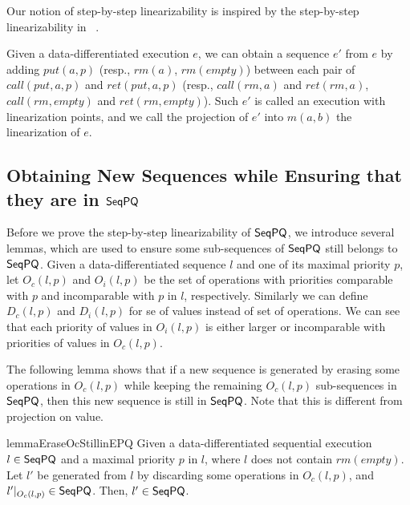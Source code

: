 Our notion of step-by-step linearizability is inspired by the step-by-step linearizability in ~\cite{DBLP:conf/icalp/BouajjaniEEH15}.


Given a data-differentiated execution $e$, we can obtain a sequence $e'$ from $e$ by adding $\textit{put}(a,p)$ (resp., $\textit{rm}(a)$, $\textit{rm}(\textit{empty})$) between each pair of $\textit{call}(\textit{put},a,p)$ and $\textit{ret}(\textit{put},a,p)$ (resp., $\textit{call}(\textit{rm},a)$ and $\textit{ret}(\textit{rm},a)$, $\textit{call}(\textit{rm},\textit{empty})$ and $\textit{ret}(\textit{rm},\textit{empty})$). Such $e'$ is called an execution with linearization points, and we call the projection of $e'$ into $m(a,b)$ the linearization of $e$.




\subsection{Obtaining New Sequences while Ensuring that they are in $\mathsf{SeqPQ}$}
\label{sec:obtaining new sequences while ensureing that they are in SeqPQ}


Before we prove the step-by-step linearizability of $\mathsf{SeqPQ}$, we introduce several lemmas, which are used to ensure some sub-sequences of $\mathsf{SeqPQ}$ still belongs to $\mathsf{SeqPQ}$. Given a data-differentiated sequence $l$ and one of its maximal priority $p$, let $O_c(l,p)$ and $O_i(l,p)$ be the set of operations with priorities comparable with $p$ and incomparable with $p$ in $l$, respectively. Similarly we can define $D_c(l,p)$ and $D_i(l,p)$ for se of values instead of set of operations. We can see that each priority of values in $O_i(l,p)$ is either larger or incomparable with priorities of values in  $O_c(l,p)$.

The following lemma shows that if a new sequence is generated by erasing some operations in $O_c(l,p)$ while keeping the remaining $O_c(l,p)$ sub-sequences in $\mathsf{SeqPQ}$, then this new sequence is still in $\mathsf{SeqPQ}$. Note that this is different from projection on value.

\begin{restatable}{lemma}{EraseOcStillinEPQ}
\label{lemma:erase Oc still in EPQ}
Given a data-differentiated sequential execution $l \in \mathsf{SeqPQ}$ and a maximal priority $p$ in $l$, where $l$ does not contain $\textit{rm}(\textit{empty})$. Let $l'$ be generated from $l$ by discarding some operations in $O_c(l,p)$, and $l' \vert_{ O_c(l,p) } \in \mathsf{SeqPQ}$. Then, $l' \in \mathsf{SeqPQ}$.
\end{restatable}

